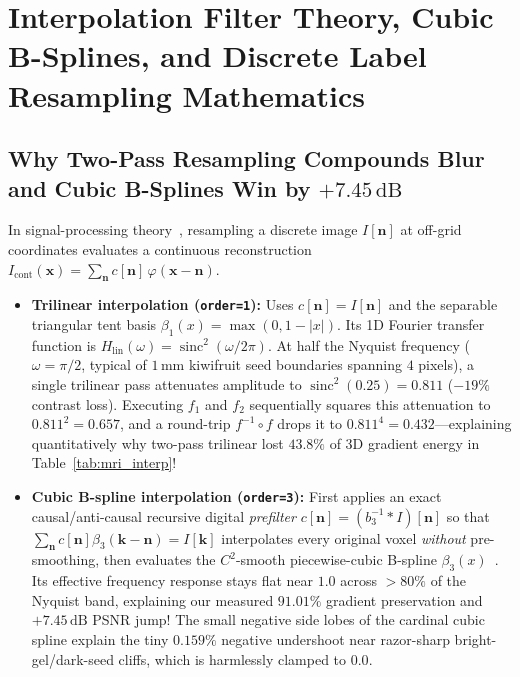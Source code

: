 \documentclass[10pt,a4paper]{article}
\renewcommand{\_}{\origunderscore\allowbreak}
\begin{document}
\clearpage
\section[Interpolation Filter Theory \& SDF Label Warping]{Interpolation Filter Theory, Cubic B-Splines, and Discrete Label Resampling Mathematics}
\label{app:interp}

\subsection{Why Two-Pass Resampling Compounds Blur and Cubic B-Splines Win by $+7.45\,\text{dB}$}

In signal-processing theory~\cite{unser1999splines,thevenaz2000interpolation}, resampling a discrete image $I[\mathbf{n}]$ at off-grid coordinates evaluates a continuous reconstruction $I_{\text{cont}}(\mathbf{x}) = \sum_{\mathbf{n}} c[\mathbf{n}]\,\varphi(\mathbf{x} - \mathbf{n})$.
\begin{itemize}
    \item \textbf{Trilinear interpolation (\texttt{order=1}):} Uses $c[\mathbf{n}] = I[\mathbf{n}]$ and the separable triangular tent basis $\beta_1(x) = \max(0, 1-|x|)$. Its 1D Fourier transfer function is $H_{\text{lin}}(\omega) = \operatorname{sinc}^2(\omega/2\pi)$. At half the Nyquist frequency ($\omega = \pi/2$, typical of $1\,\text{mm}$ kiwifruit seed boundaries spanning $4$ pixels), a single trilinear pass attenuates amplitude to $\operatorname{sinc}^2(0.25) = 0.811$ ($-19\%$ contrast loss). Executing $f_1$ and $f_2$ sequentially squares this attenuation to $0.811^2 = 0.657$, and a round-trip $f^{-1}\circ f$ drops it to $0.811^4 = \mathbf{0.432}$---explaining quantitatively why two-pass trilinear lost $43.8\%$ of 3D gradient energy in Table~\ref{tab:mri_interp}!
    \item \textbf{Cubic B-spline interpolation (\texttt{order=3}):} First applies an exact causal/anti-causal recursive digital \emph{prefilter} $c[\mathbf{n}] = (b_3^{-1} * I)[\mathbf{n}]$ so that $\sum_{\mathbf{n}} c[\mathbf{n}]\beta_3(\mathbf{k}-\mathbf{n}) = I[\mathbf{k}]$ interpolates every original voxel \emph{without} pre-smoothing, then evaluates the $C^2$-smooth piecewise-cubic B-spline $\beta_3(x)$~\cite{unser1999splines}. Its effective frequency response stays flat near $1.0$ across $>80\%$ of the Nyquist band, explaining our measured $91.01\%$ gradient preservation and $+7.45\,\text{dB}$ PSNR jump! The small negative side lobes of the cardinal cubic spline explain the tiny $0.159\%$ negative undershoot near razor-sharp bright-gel/dark-seed cliffs, which is harmlessly clamped to $0.0$.
\end{itemize}
\end{document}
